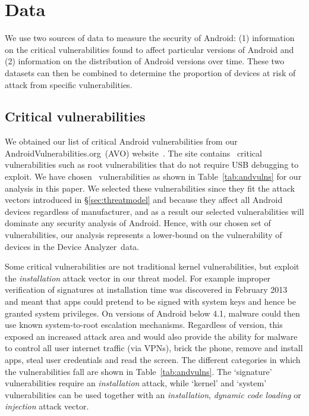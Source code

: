 \documentclass{sig-alternate-2013}
\newcommand{\da}{Device Analyzer}
\newcommand{\avo}{AVO}
\begin{document}
\section{Data}
We use two sources of data to measure the security of Android: (1) information on the critical vulnerabilities found to affect particular versions of Android and (2) information on the distribution of Android versions over time.
These two datasets can then be combined to determine the proportion of devices at risk of attack from specific vulnerabilities.

\subsection{Critical vulnerabilities}\label{sec:avo}

We obtained our list of critical Android vulnerabilities from our AndroidVulnerabilities.org~(\avo) website~\cite{androidvulnerabilities.org}.
The site contains \avoNumVulnerabilities\ critical vulnerabilities such as root vulnerabilities that do not require USB debugging to exploit.
We have chosen \daNumVulnsUsed\ vulnerabilities as shown in Table~\ref{tab:andvulns} for our analysis in this paper.
We selected these vulnerabilities since they fit the attack vectors introduced in \S\ref{sec:threatmodel} and because they affect all Android devices regardless of manufacturer, and as a result our selected vulnerabilities will dominate any security analysis of Android.
Hence, with our chosen set of vulnerabilities, our analysis represents a lower-bound on the vulnerability of devices in the \da\ data.

Some critical vulnerabilities are not traditional kernel vulnerabilities, but exploit the \emph{installation} attack vector in our threat model.
For example improper verification of signatures at installation time was discovered in February 2013~\cite{Forristal2013} and meant that apps could pretend to be signed with system keys and hence be granted system privileges.
On versions of Android below 4.1, malware could then use known system-to-root escalation mechanisms.
Regardless of version, this exposed an increased attack area and would also provide the ability for malware to control all user internet traffic (via VPNs), brick the phone, remove and install apps, steal user credentials and read the screen.
The different categories in which the vulnerabilities fall are shown in Table~\ref{tab:andvulns}. The `signature' vulnerabilities require an \emph{installation} attack, while `kernel' and `system' vulnerabilities can be used together with an \emph{installation}, \emph{dynamic code loading} or \emph{injection} attack vector.
\avoTabAndVulns
\end{document}

